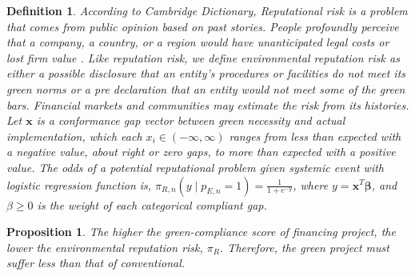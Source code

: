 \documentclass[sn-basic]{sn-jnl}%
\theoremstyle{thmstyleone}%
\newtheorem{proposition}[theorem]{Proposition}
\theoremstyle{thmstyletwo}%
\theoremstyle{thmstylethree}%
\newtheorem{definition}{Definition}%
\begin{document}
\begin{definition}
	According to Cambridge Dictionary, \emph{Reputational risk} is a problem that comes from public opinion based on past stories. People profoundly perceive that a company, a country, or a region would have unanticipated legal costs or lost firm value \citep{KUMAR201461}. Like reputation risk, we define environmental reputation risk as either a possible disclosure that an entity's procedures or facilities do not meet its green norms or a pre declaration that an entity would not meet some of the green bars. Financial markets and communities may estimate the risk from its histories. Let $\mathbf{x}$ is a conformance gap vector between green necessity and actual implementation, which each $x_i \in \left(-\infty,\infty\right)$ ranges from less than expected with a negative value, about right or zero gaps, to more than expected with a positive value. The odds of a potential reputational problem given systemic event with logistic regression function is, $\pi_{R,n}\left(y\mid p_{E,n}=1\right)=\frac{1}{1+e^{-y}}$, where $y = \mathbf{x}^T \mathbf{\beta}$, and $\beta\geq 0$ is the weight of each categorical compliant gap.
\end{definition}

\begin{proposition} \label{proposition_2}
	The higher the green-compliance score of financing project, the lower the environmental reputation risk, $\pi_{R}$. Therefore, the green project must suffer less than that of conventional.
\end{proposition}
\end{document}
